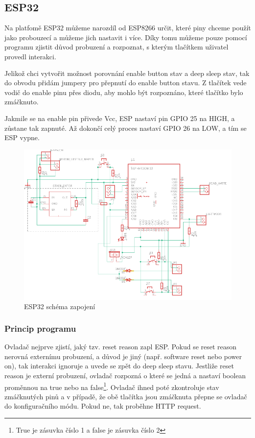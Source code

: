 \documentclass[a4paper, 12pt]{report}
\begin{document}
    \subsection{ESP32}
    Na platfomě ESP32 můžeme narozdíl od ESP8266 určit, které piny chceme použít jako probouzecí a můžeme jich nastavit i více. Díky tomu můžeme pouze pomocí programu zjistit důvod probuzení a rozpoznat, s kterým tlačítkem uživatel provedl interakci. \par
    Jelikož chci vytvořit možnost porovnání enable button stav a deep sleep stav, tak do obvodu přidám jumpery pro přepnutí do enable button stavu.
    Z tlačítek vede vodič do enable pinu přes diodu, aby mohlo být rozpoznáno, které tlačítko bylo zmáčknuto.\par
    Jakmile se na enable pin přivede Vcc, ESP nastaví pin GPIO 25 na HIGH, a zůstane tak zapnuté.
    Až dokončí celý proces nastaví GPIO 26 na LOW, a tím se ESP vypne.
    \begin{figure}[h]
        \centering
        \includegraphics[width=12cm]{images/esp32_schema}
        \caption{ESP32 schéma zapojení}
        \label{fig:ESP32_DPS}
    \end{figure}
    \subsubsection{Princip programu}
    Ovladač nejprve zjistí, jaký tzv. reset reason zapl ESP. Pokud se reset reason nerovná externímu probuzení, a důvod je jiný (např. software reset nebo power on), tak interakci ignoruje a uvede se zpět do deep sleep stavu. Jestliže reset reason je externí probuzení, ovladač rozpozná o které se jedná a nastaví boolean proměnnou na true nebo na false\footnote{True je zásuvka číslo 1 a false je zásuvka číslo 2}. Ovladač ihned poté zkontroluje stav zmáčknutých pinů a v případě, že obě tlačítka jsou zmáčknuta přepne se ovladač do konfiguračního módu. Pokud ne, tak proběhne HTTP request.
\end{document}
